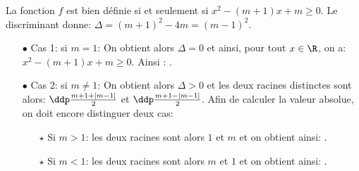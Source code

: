 \begin{correction}  \;
La fonction $f$ est bien d\'efinie si et seulement si $x^2-(m+1)x+m\geq 0$. Le discriminant donne: $\Delta=(m+1)^2-4m=(m-1)^2$.
\begin{itemize}
\item[$\bullet$] Cas 1: si $m=1$: On obtient alors $\Delta=0$ et ainsi, pour tout $x\in\R$, on a: $x^2-(m+1)x+m\geq 0$. Ainsi : . 
\item[$\bullet$] Cas 2: si $m\not= 1$: On obtient alors $\Delta>0$ et les deux racines distinctes sont alors: $\ddp\frac{m+1+|m-1|}{2}$ et $\ddp\frac{m+1-|m-1|}{2}$. Afin de calculer la valeur absolue, on doit encore distinguer deux cas:
\begin{itemize}
\item[$\star$] Si $m>1$: les deux racines sont alors $1$ et $m$ et on obtient ainsi: .
\item[$\star$] Si $m<1$: les deux racines sont alors $m$ et $1$ et on obtient ainsi: .
\end{itemize}
\end{itemize}
\end{correction}
